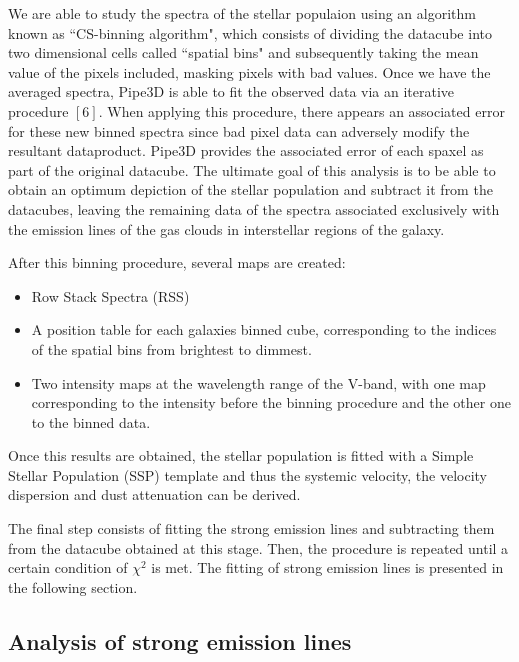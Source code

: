 We are able to study the spectra of the stellar populaion using an algorithm known as ``CS-binning algorithm", which
consists of dividing the datacube into two dimensional cells called ``spatial bins" and subsequently taking the mean value of the
pixels included, masking pixels with bad values. Once we have the averaged spectra, Pipe3D is able to fit the observed data via an
iterative procedure $[6]$. When applying this procedure, there appears an associated error for these new binned spectra since bad
pixel data can adversely modify the resultant dataproduct. Pipe3D provides the associated error of each spaxel as part of the
original datacube. The ultimate goal of this analysis is to be able to obtain an optimum depiction of the stellar population and
subtract it from the datacubes, leaving the remaining data of the spectra associated exclusively with the emission lines of the gas
clouds in interstellar regions of the galaxy.

After this binning procedure, several maps are created:
\begin{itemize}
  \item Row Stack Spectra (RSS)
  \item A position table for each galaxies binned cube, corresponding to the indices of the spatial bins from brightest to dimmest.
  \item Two intensity maps at the wavelength range of the V-band, with one map corresponding to the intensity before the binning
  procedure and the other one to the binned data.
\end{itemize}
Once this results are obtained, the stellar population is fitted with a Simple Stellar Population (SSP) template and thus the
systemic velocity, the velocity dispersion and dust attenuation can be derived.

The final step consists of fitting the strong emission lines and subtracting them from the datacube obtained at this stage. Then,
the procedure is repeated until a certain condition of $\chi^2$ is met. The fitting of strong emission lines is presented in the
following section.

\subsection{Analysis of strong emission lines}

